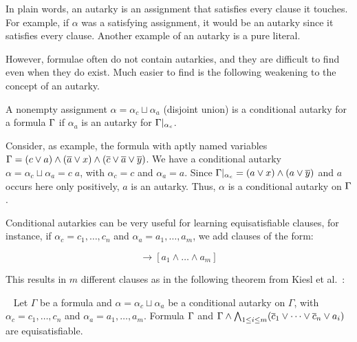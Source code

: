 In plain words, an autarky is an assignment that satisfies every clause it
touches. For example, if $\alpha$ was a satisfying assignment, it would be an
autarky since it satisfies every clause. Another example of an autarky is a pure
literal.

However, formulae often do not contain autarkies, and they are difficult to find
even when they do exist. Much easier to find is the following weakening to the
concept of an autarky. 

\begin{definition}
    A nonempty assignment $\alpha = \alpha_c \sqcup \alpha_a$ (disjoint union)
    is a conditional autarky for a formula $\Gamma$ if $\alpha_a$ is an
    autarky for $\Gamma|_{\alpha_c}$.
\end{definition}

Consider, as example, the formula with aptly named variables $\Gamma = (c \lor
a) \land (\overline{a} \lor x) \land (\overline{c} \lor \overline{a} \lor
\overline{y})$. We have a conditional autarky $\alpha = \alpha_c \sqcup \alpha_a
= c\;a$, with $\alpha_c = c$ and $\alpha_a = a$. Since $\Gamma|_{\alpha_c} =
(a \lor x) \land (a \lor \overline{y})$ and $a$ occurs here only positively, $a$
is an autarky. Thus, $\alpha$ is a conditional autarky on $\Gamma$.


Conditional autarkies can be very useful for learning equisatisfiable clauses,
for instance, if $\alpha_c = c_1, \dots, c_n$ and $\alpha_a = a_1, \dots, a_m$,
we add clauses of the form:

\begin{equation*}
    [c_1 \land \dots \land c_n] \rightarrow [a_1 \land \dots \land a_m]
\end{equation*}

This results in $m$ different clauses as in the following theorem from Kiesl et
al.~\cite{conditionalautarkies}:

\begin{theorem}~\label{thm:gbcequisat} Let $\Gamma$ be a formula and $\alpha =
    \alpha_c \sqcup \alpha_a$ be a conditional autarky on $\Gamma$, with
    $\alpha_c = c_1, \dots, c_n$ and $\alpha_a = a_1, \dots, a_m$. Formula
    $\Gamma$ and $\Gamma \land \bigwedge_{1 \leq i \leq m} (\overline{c}_1
    \lor \dots \lor \overline{c}_n \lor a_i)$ are equisatisfiable.
\end{theorem}

